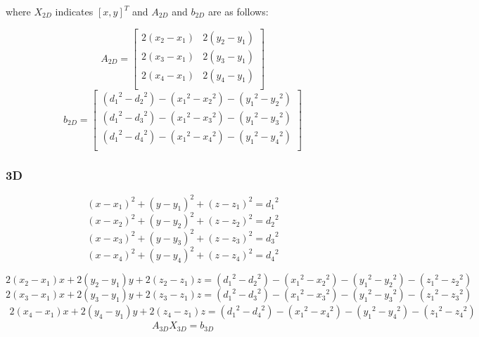 \documentclass{ieeeaccess}
\begin{document}
where $X_{2D}$ indicates $[x,y]^T$ and $A_{2D}$ and $b_{2D}$ are as follows: 

\begin{equation}
A_{2D} =\left[ {\begin{array}{cc}
	2(x_2-x_1) & 2(y_2-y_1)\\
	2(x_3-x_1) & 2(y_3-y_1)\\
	2(x_4-x_1) & 2(y_4-y_1)\\
	\end{array} } \right]
\end{equation}
\begin{equation}
b_{2D} = \left[ {\begin{array}{c}
	({d_1}^2-{d_2}^2)-({x_1}^2-{x_2}^2)-({y_1}^2-{y_2}^2)\\
	({d_1}^2-{d_3}^2)-({x_1}^2-{x_3}^2)-({y_1}^2-{y_3}^2)\\
	({d_1}^2-{d_4}^2)-({x_1}^2-{x_4}^2)-({y_1}^2-{y_4}^2)\\
	\end{array} } \right]
\end{equation}

\subsubsection{3D}

\begin{equation}
(x-x_1)^2+(y-y_1)^2+(z-z_1)^2={d_1}^2
\end{equation}
\begin{equation}
(x-x_2)^2+(y-y_2)^2+(z-z_2)^2={d_2}^2
\end{equation}
\begin{equation}
(x-x_3)^2+(y-y_3)^2+(z-z_3)^2={d_3}^2
\end{equation}
\begin{equation}
(x-x_4)^2+(y-y_4)^2+(z-z_4)^2={d_4}^2
\end{equation}


\begin{equation}
2(x_2-x_1)x+2(y_2-y_1)y+2(z_2-z_1)z =  
({d_1}^2-{d_2}^2)-({x_1}^2-{x_2}^2)-({y_1}^2-{y_2}^2)-({z_1}^2-{z_2}^2)
\end{equation}
\begin{equation}
2(x_3-x_1)x+2(y_3-y_1)y+2(z_3-z_1)z=
({d_1}^2-{d_3}^2)-({x_1}^2-{x_3}^2)-({y_1}^2-{y_3}^2)-({z_1}^2-{z_3}^2)
\end{equation}
\begin{equation}
\substack{
	2(x_4-x_1)x+2(y_4-y_1)y+2(z_4-z_1)z=
	({d_1}^2-{d_4}^2)-({x_1}^2-{x_4}^2)-({y_1}^2-{y_4}^2)-({z_1}^2-{z_4}^2)
}
\end{equation}
\begin{equation}
A_{3D}X_{3D}=b_{3D}
\end{equation}
\end{document}

